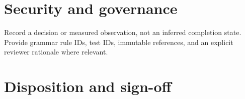 \documentclass[11pt,letterpaper]{article}
\begin{document}
\section{Security and governance}
Record a decision or measured observation, not an inferred completion state. Provide grammar rule IDs, test IDs, immutable references, and an explicit reviewer rationale where relevant.
\PTRating
\section{Disposition and sign-off}
\end{document}

